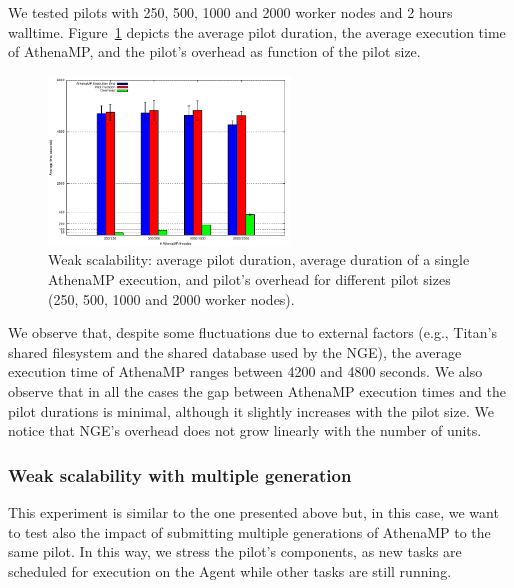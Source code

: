 We tested %
pilots %
with 250, 500, 1000 and 2000 worker nodes and
2 hours walltime. Figure~\ref{fig:weakScal1a} depicts the average pilot
duration, the average execution time of AthenaMP, and the pilot's overhead as
function of the pilot size.

\begin{figure}[!htb]
        \includegraphics[height=4.5cm,width=\columnwidth]{./figures/NGE/weak1.pdf}
    \caption{Weak scalability: average pilot duration, average duration of a
    single AthenaMP execution, and pilot's overhead for different pilot sizes
    (250, 500, 1000 and 2000 worker nodes). }
\label{fig:weakScal1a}
\end{figure}

We %
observe that, despite some fluctuations due to external factors
(e.g., Titan's shared filesystem and the shared database used by the NGE), the
average execution time of AthenaMP %
ranges between 4200 and 4800 seconds. %
We %
also observe that in all the cases the gap between AthenaMP execution times and
the pilot durations is minimal, although it slightly increases with the pilot
size. %
We %
notice that NGE's overhead does not grow linearly with the number of units.



\subsubsection{Weak scalability with multiple generation }

This experiment is similar to the one presented above but, in this case, we want
to test also the impact of submitting multiple generations of %
AthenaMP to the same pilot.
In this way, we stress the pilot's components, %
as new tasks are scheduled for execution on the Agent while other tasks are still running.

